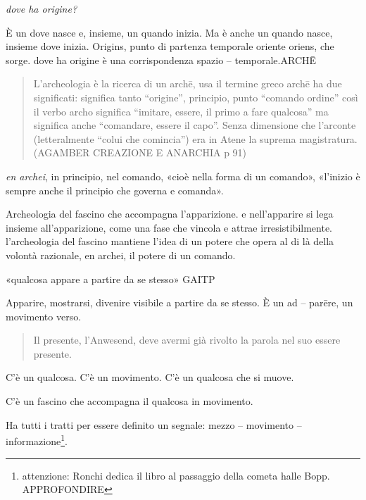 \documentclass{gs}
\begin{document}
\emph{dove ha origine?}

È un dove nasce e, insieme, un quando inizia. Ma è anche un quando nasce, insieme dove inizia. Origins, punto di partenza temporale oriente oriens, che sorge. dove ha origine è una corrispondenza spazio – temporale.ARCHĒ


\begin{quote}
\begin{sf}
\small
L'archeologia è la ricerca di un archē, usa il termine greco archē ha due significati: significa tanto “origine”, principio, punto “comando ordine” così il verbo archo significa “imitare, essere, il primo a fare qualcosa” ma significa anche “comandare, essere il capo”. Senza dimensione che l'arconte (letteralmente “colui che comincia”) era in Atene la suprema magistratura. (AGAMBER CREAZIONE E ANARCHIA p 91) 
\end{sf}
\end{quote}

\emph{en archei}, in principio, nel comando, «cioè nella forma di un comando», «l'inizio è sempre anche il principio che governa e comanda».

Archeologia del fascino che accompagna l'apparizione. e nell'apparire si lega insieme all'apparizione, come una fase che vincola e attrae irresistibilmente. l'archeologia del fascino mantiene l'idea di un potere che opera al di là della volontà razionale, en archei, il potere di un comando.

«qualcosa appare a partire da se stesso» GAITP

Apparire, mostrarsi, divenire visibile a partire da se stesso. È un ad – parēre, un movimento verso.

\begin{quote}
\begin{sf}
\small
Il presente, l'Anwesend, deve avermi già rivolto la parola nel suo essere presente.
\end{sf}
\end{quote}

C'è un qualcosa. C'è un movimento. C'è un qualcosa che si muove.

C'è un fascino che accompagna il qualcosa in movimento.

Ha tutti i tratti per essere definito un segnale: mezzo – movimento – informazione\footnote{attenzione: Ronchi dedica il libro al passaggio della cometa halle Bopp. APPROFONDIRE}. 
\end{document}
